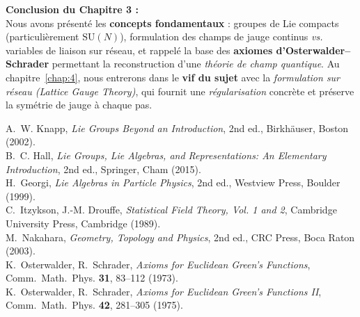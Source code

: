 	\noindent
	\textbf{Conclusion du Chapitre 3 :}\\
	Nous avons présenté les \textbf{concepts fondamentaux} : groupes de Lie compacts (particulièrement \(\mathrm{SU}(N)\)), formulation des champs de jauge continus \textit{vs.} variables de liaison sur réseau, et rappelé la base des \textbf{axiomes d’Osterwalder--Schrader} permettant la reconstruction d’une \emph{théorie de champ quantique}.  
	Au chapitre~\ref{chap:4}, nous entrerons dans le \textbf{vif du sujet} avec la \emph{formulation sur réseau (Lattice Gauge Theory)}, qui fournit une \emph{régularisation} concrète et préserve la symétrie de jauge à chaque pas.
	
	\vspace{2em}
	
	\begin{thebibliography}{99}
		
		A.~W. Knapp,
		\textit{Lie Groups Beyond an Introduction}, 2nd ed.,
		Birkhäuser, Boston (2002).
		\\[-0.75em]
		
		B.~C. Hall,
		\textit{Lie Groups, Lie Algebras, and Representations: An Elementary Introduction}, 2nd ed.,
		Springer, Cham (2015).
		\\[-0.75em]
		
		H.~Georgi,
		\textit{Lie Algebras in Particle Physics}, 2nd ed.,
		Westview Press, Boulder (1999).
		\\[-0.75em]
		
		C.~Itzykson, J.-M. Drouffe,
		\textit{Statistical Field Theory, Vol. 1 and 2},
		Cambridge University Press, Cambridge (1989).
		\\[-0.75em]
		
		M.~Nakahara,
		\textit{Geometry, Topology and Physics}, 2nd ed.,
		CRC Press, Boca Raton (2003).
		\\[-0.75em]
		
		K.~Osterwalder, R.~Schrader,
		\textit{Axioms for Euclidean Green's Functions},
		Comm.~Math.~Phys. \textbf{31}, 83--112 (1973).
		\\[-0.75em]
		
		K.~Osterwalder, R.~Schrader,
		\textit{Axioms for Euclidean Green's Functions II},
		Comm.~Math.~Phys. \textbf{42}, 281--305 (1975).
		
	\end{thebibliography}
	
